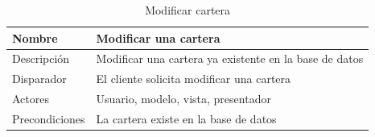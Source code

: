 \documentclass[12pt, a4paper]{book}
\begin{document}
\begin{table}[htbp]
	\centering
	\caption{Modificar cartera}
	\label{my-label}
	\begin{tabular}{|l|l|}
		\hline
		Nombre          & Modificar una cartera                                                                                                                                                                                                                                                                                                                                                                          \\ \hline
		Descripción     & Modificar una cartera ya existente en la base de datos                                                                                                                                                                                                                                                                                                                                         \\ \hline
		Disparador      & El cliente solicita modificar una cartera                                                                                                                                                                                                                                                                                                                                                      \\ \hline
		Actores         & Usuario, modelo, vista, presentador                                                                                                                                                                                                                                                                                                                                                            \\ \hline
		Precondiciones  & La cartera existe en la base de datos                                                                                                                                                                                                                                                                                                                                                          \\ \hline

\end{tabular}
\end{table}
\end{document}
